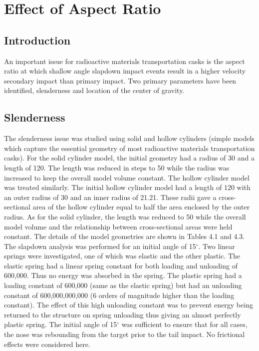 \chapter{Effect of Aspect Ratio}

\section{Introduction}

     An important issue for radioactive materials transportation casks
is the aspect ratio at which shallow angle slapdown impact events
result in a higher velocity secondary impact than primary impact.  Two
primary parameters have been identified, slenderness and location of
the center of gravity. 

\section{Slenderness}

The slenderness issue was studied using solid and hollow cylinders
(simple models which capture the essential geometry of most
radioactive materials transportation casks).  For the solid cylinder
model, the initial geometry had a radius of 30 and a length of 120.
The length was reduced in steps to 50 while the radius was increased
to keep the overall model volume constant. The
hollow cylinder model was treated similarly.  The initial 
hollow cylinder model
had a length of 120 with an outer radius of 30 and an inner
radius of 21.21.  These radii gave a cross-sectional area of the
hollow cylinder equal to half the area enclosed by the outer radius.
As for the solid cylinder, the length was reduced to 50 while the
overall model volume and the relationship between cross-sectional
areas were held constant. The details of the model geometries are
shown in Tables 4.1 and 4.3.  
The slapdown analysis was performed for an
initial angle of 15$^\circ$.  Two linear springs were investigated, one of
which was elastic and the other plastic.  The elastic spring had a
linear spring constant for both loading and unloading of 600,000. 
Thus no energy was absorbed in the spring.  The plastic spring had a
loading constant of 600,000 (same as the elastic spring) but had an
unloading constant of 600,000,000,000 (6 orders of magnitude higher
than the loading constant).  The effect of this high unloading
constant was to prevent energy being returned to the structure on
spring unloading thus giving an almost perfectly plastic spring. The
initial angle of 15$^\circ$ was sufficient to ensure that for all cases,
the nose was rebounding from the target prior to the tail impact.  No
frictional effects were considered here. 

